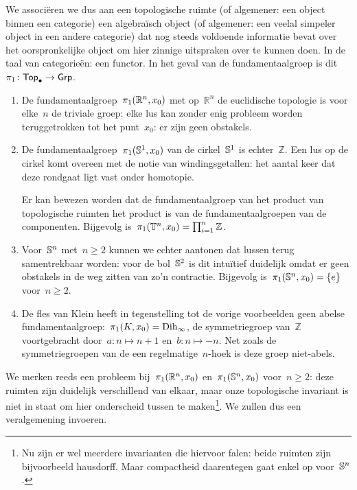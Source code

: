 \documentclass[a4paper,11pt]{article}
\begin{document}
We associ\"eren we dus aan een topologische ruimte (of algemener: een object binnen een categorie) een algebra\"isch object (of algemener: een veelal simpeler object in een andere categorie) dat nog steeds voldoende informatie bevat over het oorspronkelijke object om hier zinnige uitspraken over te kunnen doen. In de taal van categorie\"en: een functor. In het geval van de fundamentaalgroep is dit~$\pi_1\colon\mathsf{Top}_{\bullet}\to\mathsf{Grp}$.

\begin{example}
  \begin{enumerate}
    \item De fundamentaalgroep~$\pi_1(\mathbb{R}^n,x_0)$ met op~$\mathbb{R}^n$ de euclidische topologie is voor elke~$n$ de triviale groep: elke lus kan zonder enig probleem worden teruggetrokken tot het punt~$x_0$: er zijn geen obstakels.

    \item De fundamentaalgroep~$\pi_1(\mathbb{S}^1,x_0)$ van de cirkel~$\mathbb{S}^1$ is echter~$\mathbb{Z}$. Een lus op de cirkel komt overeen met de notie van windingsgetallen: het aantal keer dat deze rondgaat ligt vast onder homotopie.

      Er kan bewezen worden dat de fundamentaalgroep van het product van topologische ruimten het product is van de fundamentaalgroepen van de componenten. Bijgevolg is~$\pi_1(\mathbb{T}^n,x_0)=\prod_{i=1}^n\mathbb{Z}$.

    \item Voor~$\mathbb{S}^n$ met~$n\geq 2$ kunnen we echter aantonen dat lussen terug samentrekbaar worden: voor de bol~$\mathbb{S}^2$ is dit intu\"itief duidelijk omdat er geen obstakels in de weg zitten van zo'n contractie. Bijgevolg is~$\pi_1(\mathbb{S}^n,x_0)=\left\{ e \right\}$ voor~$n\geq 2$.

    \item De fles van Klein heeft in tegenstelling tot de vorige voorbeelden geen abelse fundamentaalgroep:~$\pi_1(K,x_0)=\mathrm{Dih}_{\infty}$, de symmetriegroep van~$\mathbb{Z}$ voortgebracht door~$a\colon n\mapsto n+1$ en~$b\colon n\mapsto -n$. Net zoals de symmetriegroepen van de een regelmatige~$n$\nobreakdash-hoek is deze groep niet-abels. 
  \end{enumerate}
\end{example}

We merken reeds een probleem bij~$\pi_1(\mathbb{R}^n,x_0)$ en~$\pi_1(\mathbb{S}^n,x_0)$ voor~$n\geq 2$: deze ruimten zijn duidelijk verschillend van elkaar, maar onze topologische invariant is niet in staat om hier onderscheid tussen te maken\footnote{Nu zijn er wel meerdere invarianten die hiervoor falen: beide ruimten zijn bijvoorbeeld hausdorff. Maar compactheid daarentegen gaat enkel op voor~$\mathbb{S}^n$.}. We zullen dus een veralgemening invoeren.
\end{document}
